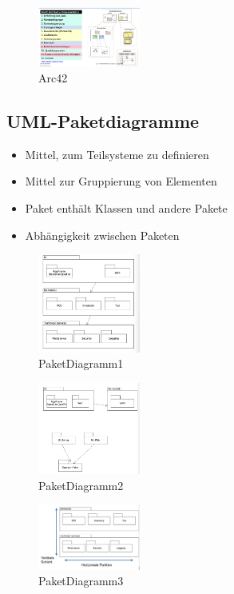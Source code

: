 \documentclass{article}
\begin{document}
\begin{figure}[H]			\includegraphics[width=0.3\textwidth] {Resources/Images/Arc42.png}
\caption{\label{fig:Arc42}Arc42}
\end{figure}

\subsection{UML-Paketdiagramme}

\begin{itemize}
	\item Mittel, zum Teilsysteme zu definieren
	\item Mittel zur Gruppierung von Elementen
	\item Paket enthält Klassen und andere Pakete
	\item Abhängigkeit zwischen Paketen
\end{itemize}


\begin{multicols}{3}
\begin{figure}[H]			\includegraphics[width=0.3\textwidth] {Resources/Images/PaketDiagramm1.png}
\caption{\label{fig:PaketDiagramm1}PaketDiagramm1}
\end{figure}
\columnbreak
\begin{figure}[H]			\includegraphics[width=0.3\textwidth] {Resources/Images/PaketDiagramm2.png}
\caption{\label{fig:PaketDiagramm2}PaketDiagramm2}
\end{figure}

\columnbreak
\begin{figure}[H]			\includegraphics[width=0.3\textwidth] {Resources/Images/PaketDiagramm3.png}
\caption{\label{fig:PaketDiagramm3}PaketDiagramm3}
\end{figure}

\end{multicols}
\end{document}
